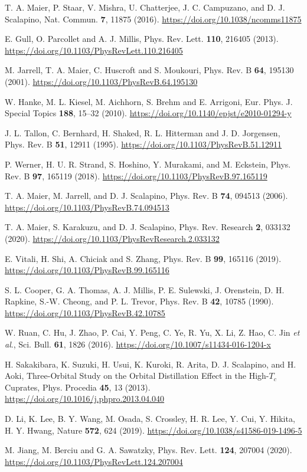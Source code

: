 \documentclass[reprint,nofootinbib,nobibnotes,amsmath,amssymb,aps,prb,floatfix]{revtex4-2}
\begin{document}
\begin{thebibliography}{99}
 T. A. Maier, P. Staar, V. Mishra, U. Chatterjee, J. C. Campuzano, and D. J. Scalapino, Nat. Commun. {\bf 7}, 11875 (2016). \url{https://doi.org/10.1038/ncomms11875}

 E. Gull, O. Parcollet and A. J. Millis, Phys. Rev. Lett. {\bf 110}, 216405 (2013). \url{https://doi.org/10.1103/PhysRevLett.110.216405}

 M. Jarrell, T. A. Maier, C. Huscroft and S. Moukouri, Phys. Rev. B {\bf 64}, 195130 (2001). \url{https://doi.org/10.1103/PhysRevB.64.195130}

 W. Hanke, M. L. Kiesel, M. Aichhorn, S. Brehm and E. Arrigoni, Eur. Phys. J. Special Topics {\bf 188}, 15–32 (2010). \url{https://doi.org/10.1140/epjst/e2010-01294-y}

J. L. Tallon, C. Bernhard, H. Shaked, R. L. Hitterman and
J. D. Jorgensen, Phys. Rev. B {\bf 51}, 12911 (1995). \url{https://doi.org/10.1103/PhysRevB.51.12911}

 P. Werner, H. U. R. Strand, S. Hoshino, Y. Murakami, and M. Eckstein, Phys. Rev. B {\bf 97}, 165119 (2018). \url{https://doi.org/10.1103/PhysRevB.97.165119}

 T. A. Maier, M. Jarrell, and D. J. Scalapino, Phys. Rev. B {\bf 74}, 094513 (2006).
\url{https://doi.org/10.1103/PhysRevB.74.094513}

 T. A. Maier, S. Karakuzu, and D. J. Scalapino, 
Phys. Rev. Research {\bf 2}, 033132 (2020). \url{https://doi.org/10.1103/PhysRevResearch.2.033132} 

 E. Vitali, H. Shi, A. Chiciak and S. Zhang, Phys. Rev. B {\bf 99}, 165116 (2019). \url{https://doi.org/10.1103/PhysRevB.99.165116}

 S. L. Cooper, G. A. Thomas, A. J. Millis, P. E. Sulewski, J. Orenstein, D. H. Rapkine, S.-W. Cheong, and P. L. Trevor, Phys. Rev. B {\bf 42}, 10785 (1990). \url{https://doi.org/10.1103/PhysRevB.42.10785}

W. Ruan, C. Hu, J. Zhao, P. Cai, Y. Peng, C. Ye, R. Yu, X. Li, Z. Hao, C. Jin {\it et al}., Sci. Bull. {\bf 61}, 1826 (2016). \url{https://doi.org/10.1007/s11434-016-1204-x}

 H. Sakakibara, K. Suzuki, H. Usui, K. Kuroki, R. Arita, D. J. Scalapino, and H. Aoki, Three-Orbital Study on the Orbital Distillation Effect in the High-$T_c$ Cuprates, Phys. Procedia {\bf 45}, 13 (2013). \url{https://doi.org/10.1016/j.phpro.2013.04.040}

 D. Li, K. Lee, B. Y. Wang, M. Osada, S. Crossley, H. R. Lee, Y. Cui, Y. Hikita, H. Y. Hwang, Nature {\bf 572}, 624 (2019). \url{https://doi.org/10.1038/s41586-019-1496-5}

 M. Jiang, M. Berciu and G. A. Sawatzky, Phys. Rev. Lett. {\bf 124}, 207004 (2020). \url{https://doi.org/10.1103/PhysRevLett.124.207004}

\end{thebibliography}
\end{document}
